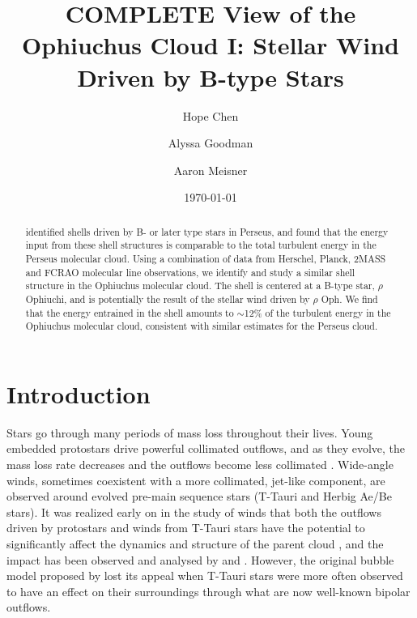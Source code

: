 \documentclass[11pt,a4paper]{emulateapj}
\begin{document}
\title{COMPLETE View of the Ophiuchus Cloud I: Stellar Wind Driven by B-type Stars}
\author{Hope Chen }
\author{Alyssa Goodman }
\author{Aaron Meisner }
\date{\today}

\begin{abstract}
\cite{Arce_2010} identified shells driven by B- or later type stars in Perseus, and found that the energy input from these shell structures is comparable to the total turbulent energy in the Perseus molecular cloud. Using a combination of data from Herschel, Planck, 2MASS and FCRAO molecular line observations, we identify and study a similar shell structure in the Ophiuchus molecular cloud. The shell is centered at a B-type star, $\rho$ Ophiuchi, and is potentially the result of the stellar wind driven by $\rho$ Oph. We find that the energy entrained in the shell amounts to $\sim$12\% of the turbulent energy in the Ophiuchus molecular cloud, consistent with similar estimates for the Perseus cloud.
\end{abstract}

\section{Introduction} 
Stars go through many periods of mass loss throughout their lives. Young embedded protostars drive powerful collimated outflows, and as they evolve, the mass loss rate decreases and the outflows become less collimated \citep{Bontemps_1996,Arce_2006}. Wide-angle winds, sometimes coexistent with a more collimated, jet-like component, are observed around evolved pre-main sequence stars (T-Tauri and Herbig Ae/Be stars). It was realized early on in the study of winds that both the outflows driven by protostars and winds from T-Tauri stars have the potential to significantly affect the dynamics and structure of the parent cloud \citep{Norman_1980}, and the impact has been observed and analysed by \cite{Arce_2006} and \citet{Arce_2010}. However, the original bubble model proposed by \citet{Norman_1980} lost its appeal when T-Tauri stars were more often observed to have an effect on their surroundings through what are now well-known bipolar outflows.
\end{document}

